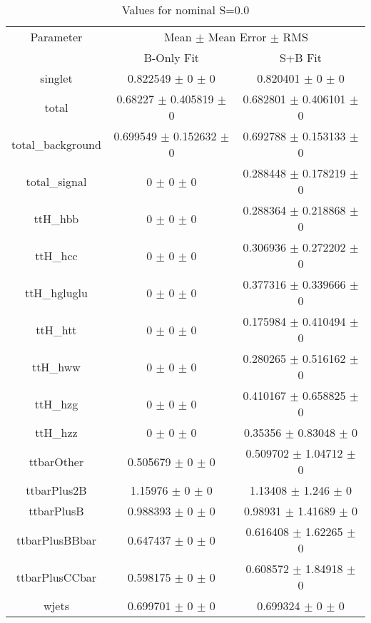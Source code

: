 \begin{table}
\centering
\caption{Values for nominal S=0.0}
\begin{tabular}{ccc}
\toprule
Parameter & \multicolumn{2}{c}{Mean $\pm$ Mean Error $\pm$ RMS}\\
 & B-Only Fit & S+B Fit\\
\midrule
singlet & \num{0.822549} $\pm$ \num{0} $\pm$ \num{0} & \num{0.820401} $\pm$ \num{0} $\pm$ \num{0}\\
total & \num{0.68227} $\pm$ \num{0.405819} $\pm$ \num{0} & \num{0.682801} $\pm$ \num{0.406101} $\pm$ \num{0}\\
total\_background & \num{0.699549} $\pm$ \num{0.152632} $\pm$ \num{0} & \num{0.692788} $\pm$ \num{0.153133} $\pm$ \num{0}\\
total\_signal & \num{0} $\pm$ \num{0} $\pm$ \num{0} & \num{0.288448} $\pm$ \num{0.178219} $\pm$ \num{0}\\
ttH\_hbb & \num{0} $\pm$ \num{0} $\pm$ \num{0} & \num{0.288364} $\pm$ \num{0.218868} $\pm$ \num{0}\\
ttH\_hcc & \num{0} $\pm$ \num{0} $\pm$ \num{0} & \num{0.306936} $\pm$ \num{0.272202} $\pm$ \num{0}\\
ttH\_hgluglu & \num{0} $\pm$ \num{0} $\pm$ \num{0} & \num{0.377316} $\pm$ \num{0.339666} $\pm$ \num{0}\\
ttH\_htt & \num{0} $\pm$ \num{0} $\pm$ \num{0} & \num{0.175984} $\pm$ \num{0.410494} $\pm$ \num{0}\\
ttH\_hww & \num{0} $\pm$ \num{0} $\pm$ \num{0} & \num{0.280265} $\pm$ \num{0.516162} $\pm$ \num{0}\\
ttH\_hzg & \num{0} $\pm$ \num{0} $\pm$ \num{0} & \num{0.410167} $\pm$ \num{0.658825} $\pm$ \num{0}\\
ttH\_hzz & \num{0} $\pm$ \num{0} $\pm$ \num{0} & \num{0.35356} $\pm$ \num{0.83048} $\pm$ \num{0}\\
ttbarOther & \num{0.505679} $\pm$ \num{0} $\pm$ \num{0} & \num{0.509702} $\pm$ \num{1.04712} $\pm$ \num{0}\\
ttbarPlus2B & \num{1.15976} $\pm$ \num{0} $\pm$ \num{0} & \num{1.13408} $\pm$ \num{1.246} $\pm$ \num{0}\\
ttbarPlusB & \num{0.988393} $\pm$ \num{0} $\pm$ \num{0} & \num{0.98931} $\pm$ \num{1.41689} $\pm$ \num{0}\\
ttbarPlusBBbar & \num{0.647437} $\pm$ \num{0} $\pm$ \num{0} & \num{0.616408} $\pm$ \num{1.62265} $\pm$ \num{0}\\
ttbarPlusCCbar & \num{0.598175} $\pm$ \num{0} $\pm$ \num{0} & \num{0.608572} $\pm$ \num{1.84918} $\pm$ \num{0}\\
wjets & \num{0.699701} $\pm$ \num{0} $\pm$ \num{0} & \num{0.699324} $\pm$ \num{0} $\pm$ \num{0}\\
\bottomrule
\end{tabular}
\end{table}